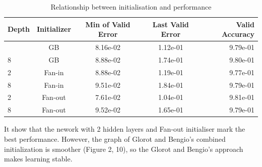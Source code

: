 \documentclass{article}
\begin{document}
\begin{table}[htb]
\vskip 3mm
\begin{center}
\begin{small}
\begin{sc}
\small
\begin{tabular}{lcccr}
\hline
\abovespace\belowspace
Depth & Initializer & Min of Valid Error & Last Valid Error & Valid Accuracy \\
\hline
\abovespace
2 &  GB & 8.16e-02 & 1.12e-01 & 9.79e-01\\
8 &  GB & 8.88e-02 & 1.74e-01 & 9.80e-01\\
2 &  Fan-in & 8.88e-02 & 1.19e-01 & 9.77e-01\\
8 &  Fan-in & 9.51e-02 & 1.84e-01 & 9.79e-01\\
2 &  Fan-out & 7.61e-02 & 1.04e-01 & 9.81e-01\\
8 &  Fan-out & 9.52e-02 & 1.65e-01 & 9.79e-01\\
\hline
\end{tabular}
\end{sc}
\end{small}
\caption{Relationship between initialisation and performance}
\label{tab:sample-table}
\end{center}
\vskip -3mm
\end{table}

It show that the nework with 2 hidden layers and Fan-out initialiser mark the best performance. However, the graph of Glorot and Bengio's combined initialization is smoother (Figure 2, 10), so the Glorot and Bengio's approach makes learning stable.
\end{document}
